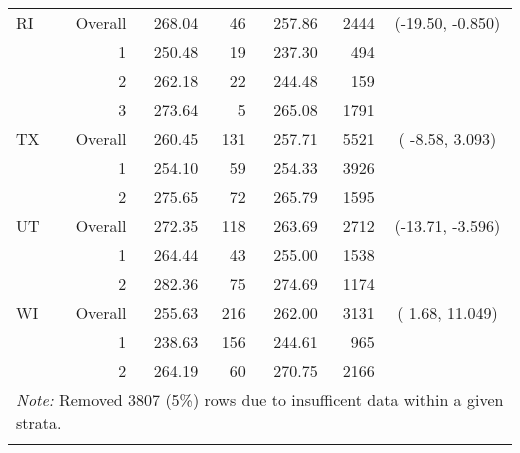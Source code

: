 \begin{longtable}{lrrr@{\extracolsep{.25cm}}rrc}
   \hline
RI & Overall & 268.04 &  46 & 257.86 & 2444 & (-19.50,  -0.850) \\ 
   & 1 & 250.48 &  19 & 237.30 & 494 &  \\ 
   & 2 & 262.18 &  22 & 244.48 & 159 &  \\ 
   & 3 & 273.64 &   5 & 265.08 & 1791 &  \\ 
   \hline
TX & Overall & 260.45 & 131 & 257.71 & 5521 & ( -8.58,   3.093) \\ 
   & 1 & 254.10 &  59 & 254.33 & 3926 &  \\ 
   & 2 & 275.65 &  72 & 265.79 & 1595 &  \\ 
   \hline
UT & Overall & 272.35 & 118 & 263.69 & 2712 & (-13.71,  -3.596) \\ 
   & 1 & 264.44 &  43 & 255.00 & 1538 &  \\ 
   & 2 & 282.36 &  75 & 274.69 & 1174 &  \\ 
   \hline
WI & Overall & 255.63 & 216 & 262.00 & 3131 & (  1.68,  11.049) \\ 
   & 1 & 238.63 & 156 & 244.61 & 965 &  \\ 
   & 2 & 264.19 &  60 & 270.75 & 2166 &  \\ 
   \hline \multicolumn{7}{l}{\textit{Note:} Removed 3807 (5\%) rows due to insufficent data within a given strata.} \\\hline
\label{g8read-mlpsa-ctree}
\end{longtable}
